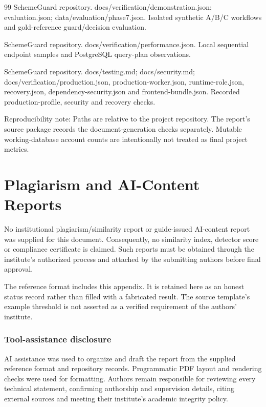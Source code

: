 \documentclass[12pt,a4paper,twoside]{report}
\begin{document}
\begin{thebibliography}{99}
SchemeGuard repository. docs/verification/demonstration.json; evaluation.json; data/evaluation/phase7.json. Isolated synthetic A/B/C workflows and gold-reference guard/decision evaluation.

SchemeGuard repository. docs/verification/performance.json. Local sequential endpoint samples and PostgreSQL query-plan observations.

SchemeGuard repository. docs/testing.md; docs/security.md; docs/verification/production.json, production-worker.json, runtime-role.json, recovery.json, dependency-security.json and frontend-bundle.json. Recorded production-profile, security and recovery checks.

{\small Reproducibility note: Paths are relative to the project repository. The report's source package records the document-generation checks separately. Mutable working-database account counts are intentionally not treated as final project metrics.}

\end{thebibliography}\clearpage

\appendix

\clearpage\chapter{Plagiarism and AI-Content Reports}

No institutional plagiarism/similarity report or guide-issued AI-content report was supplied for this document. Consequently, no similarity index, detector score or compliance certificate is claimed. Such reports must be obtained through the institute's authorized process and attached by the submitting authors before final approval.

The reference format includes this appendix. It is retained here as an honest status record rather than filled with a fabricated result. The source template's example threshold is not asserted as a verified requirement of the authors' institute.

\subsection*{Tool-assistance disclosure}

AI assistance was used to organize and draft the report from the supplied reference format and repository records. Programmatic PDF layout and rendering checks were used for formatting. Authors remain responsible for reviewing every technical statement, confirming authorship and supervision details, citing external sources and meeting their institute's academic integrity policy.
\end{document}
